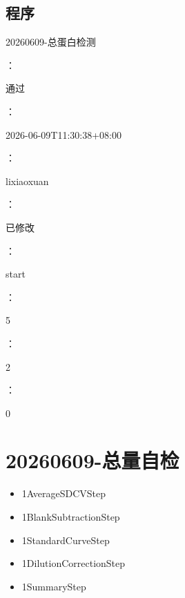 \documentclass[UTF8,10pt,a4paper,fontset=fandol]{ctexart}
\newcommand{\fieldvalue}[1]{#1}
\begin{document}
\subsection*{程序}


\fieldvalue{20260609-总蛋白检测}

：

\fieldvalue{通过}

：

\fieldvalue{2026-06-09T11:30:38+08:00}

：

\fieldvalue{lixiaoxuan}

：

\fieldvalue{已修改}

：

\fieldvalue{start}

：

\fieldvalue{5}

：

\fieldvalue{2}

：

\fieldvalue{0}



\newpage

\section*{20260609-总量自检}

\begin{itemize}
    \item 1\quad \fieldvalue{AverageSDCVStep}
    \item 1\quad \fieldvalue{BlankSubtractionStep}
    \item 1\quad \fieldvalue{StandardCurveStep}
    \item 1\quad \fieldvalue{DilutionCorrectionStep}
    \item 1\quad \fieldvalue{SummaryStep}
\end{itemize}
\end{document}
